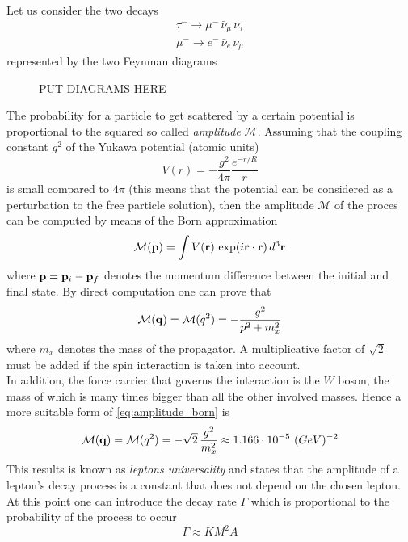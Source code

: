 Let us consider the two decays 
\begin{gather*}
    \tau^- \rightarrow \mu^- \, \bar\nu_{\mu} \, \nu_{\tau} \\
    \mu^- \rightarrow e^- \, \bar\nu_e \, \nu_{\mu}
\end{gather*}
represented by the two Feynman diagrams
\begin{figure}
    PUT DIAGRAMS HERE
\end{figure}
The probability for a particle to get scattered by a certain potential is proportional to the squared so called \emph{amplitude} $\mathcal{M}$.
Assuming that the coupling constant $g^2$ of the Yukawa potential (atomic units)
\begin{equation*}
    V(r) = -\frac{g^2}{4\pi} \frac{e^{-r/R}}{r}
\end{equation*}
is small compared to $4\pi$ (this means that the potential can be considered as a perturbation to the free particle solution), then the amplitude $\mathcal{M}$ of the proces can be computed by means of the Born approximation
\begin{equation*}
    \mathcal{M}(\mathbf{p}) = \int V(\mathbf{r}) \, \exp(i\mathbf{r}\cdot\mathbf{r}) \, d^3\mathbf{r}
\end{equation*}
where $\mathbf{p} = \mathbf{p}_i - \mathbf{p}_f$ denotes the momentum difference between the initial and final state. By direct computation one can prove that 
\begin{equation}
    \mathcal{M}(\mathbf{q}) = \mathcal{M}(q^2) = - \frac{g^2}{p^2 + m_x^2}
    \label{eq:amplitude_born}
\end{equation}
where $m_x$ denotes the mass of the propagator. A multiplicative factor of $\sqrt{2}$ must be added if the spin interaction is taken into account. \\
In addition, the force carrier that governs the interaction is the $W$ boson, the mass of which is many times bigger than all the other involved masses. Hence a more suitable form of 
\ref{eq:amplitude_born} is 
\begin{equation*}
    \mathcal{M}(\mathbf{q}) = \mathcal{M}(q^2) = - \sqrt{2} \, \frac{g^2}{m_x^2} \approx 1.166 \cdot 10^{-5}~(GeV)^{-2}
\end{equation*}
This results is known as \emph{leptons universality} and states that the amplitude of a lepton's decay process is a constant that does not depend on the chosen lepton. \\
At this point one can introduce the decay rate $\Gamma$ which is proportional to the probability of the process to occur
\begin{equation*}
    \Gamma \approx K M^2 A
\end{equation*}
